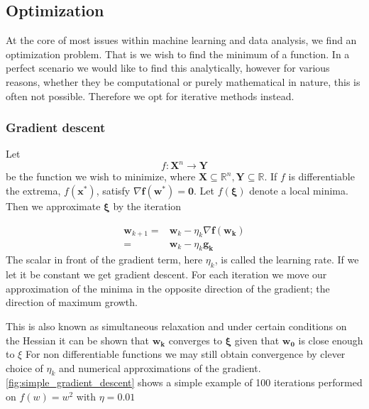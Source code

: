 \documentclass{article}
\theoremstyle{definition}
\begin{document}
\subsection{Optimization}

At the core of most issues within machine learning and data analysis, we find an optimization problem. That is we wish to find the minimum of a function. In a perfect scenario we would like to find this analytically, however for various reasons, whether they be computational or purely mathematical in nature, this is often not possible. Therefore we opt for iterative methods instead.
\subsubsection{Gradient descent}

Let  $$f: \mathbf{X}^n \rightarrow \mathbf{Y}$$ be the function we wish to minimize, where $ \mathbf{X} \subseteq \mathbb{R}^n, \mathbf{Y}\subseteq \mathbb{R}$. If $f$ is differentiable the extrema, $f(\mathbf{x^*})$, satisfy $\nabla \mathbf{f(w^*)} = \mathbf{0}$. Let $f(\mathbf{\xi})$ denote a local minima. Then we approximate $\mathbf{\xi}$ by the iteration

\begin{align*} \label{eq:1}
\mathbf{w}_{k+1} =& \mathbf{w}_k - \eta_k \nabla  \mathbf{f(\mathbf{w}_k)}\\
 =& \mathbf{w}_k - \eta_k  \mathbf{g_k}
\end{align*}
The scalar in front of the gradient term, here $\eta_k$, is called the learning rate. If we let it be constant we get gradient descent. For each iteration we move our approximation of the minima in the opposite direction of the gradient; the direction of maximum growth. 

This is also known as simultaneous relaxation and under certain conditions on the Hessian it can be shown that 
$\mathbf{w_k}$ converges to $\mathbf{\xi}$  given that $\mathbf{w_0}$ is close enough to $\xi$ \cite[p.~117--118]{introNumeric}
For non differentiable functions we may still obtain convergence by clever choice of $\eta_k$ and numerical approximations of the gradient. 
\autoref{fig:simple_gradient_descent} shows a simple example of 100 iterations performed on $f(w) = w^2$ with $\eta = 0.01$
\end{document}
